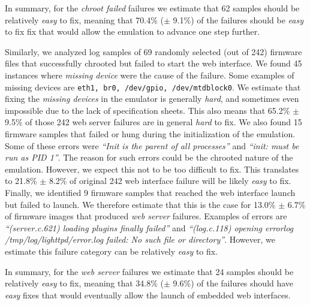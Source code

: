 \documentclass[conference]{./templates/ndss/IEEEtran}
\newcounter{t0d0_counter}
\newcounter{pr00f_counter}
\newcommand{\CountFirmwareEmulatedWebServerNOTStarted}{242}
\newcommand{\EmulatedNOTOKRandSamplFixEASY}{62}
\newcommand{\EmulatedNOTOKRandSamplFixEASYPct}{70.4\%}
\newcommand{\EmulatedNOTOKRandSamplFixEASYConfInt}{9.1\%}
\newcommand{\WebServerNOTOKRandSampl}{69}
\newcommand{\WebServerNOTOKRandSamplDeviceFail}{45}
\newcommand{\WebServerNOTOKRandSamplDeviceFailPct}{65.2\%}
\newcommand{\WebServerNOTOKRandSamplDeviceFailConfInt}{9.5\%}
\newcommand{\WebServerNOTOKRandSamplInitFail}{15}
\newcommand{\WebServerNOTOKRandSamplInitFailPct}{21.8\%}
\newcommand{\WebServerNOTOKRandSamplInitFailConfInt}{8.2\%}
\newcommand{\WebServerNOTOKRandSamplWebservFail}{9}
\newcommand{\WebServerNOTOKRandSamplWebservFailPct}{13.0\%}
\newcommand{\WebServerNOTOKRandSamplWebservFailConfInt}{6.7\%}
\newcommand{\WebServerNOTOKRandSamplFixEASY}{24}
\newcommand{\WebServerNOTOKRandSamplFixEASYPct}{34.8\%}
\newcommand{\WebServerNOTOKRandSamplFixEASYConfInt}{9.6\%}
\begin{document}
    In summary, for the \emph{chroot failed} failures we estimate that 
\EmulatedNOTOKRandSamplFixEASY{} samples should be relatively \emph{easy} to fix, 
meaning that \EmulatedNOTOKRandSamplFixEASYPct{} 
($\pm$ \EmulatedNOTOKRandSamplFixEASYConfInt{}) of the failures should be \emph{easy} to fix  fix
that would allow the emulation to advance one step further. 

Similarly, we analyzed log samples of \WebServerNOTOKRandSampl{} randomly selected 
(out of \CountFirmwareEmulatedWebServerNOTStarted{}) firmware files that 
successfully chrooted but failed to start the web interface. 
    We found \WebServerNOTOKRandSamplDeviceFail{} instances where \emph{missing device} 
were the cause of the failure. Some examples of missing devices are 
\texttt{eth1, br0, /dev/gpio, /dev/mtdblock0}. We estimate that fixing 
the \emph{missing devices} in the emulator is generally \emph{hard}, and 
sometimes even impossible due to the lack of specification sheets. 
This also means that \WebServerNOTOKRandSamplDeviceFailPct{} $\pm$ 
\WebServerNOTOKRandSamplDeviceFailConfInt{} of those 
\CountFirmwareEmulatedWebServerNOTStarted{} web server failures are 
in general \emph{hard} to fix. 
    We also found \WebServerNOTOKRandSamplInitFail{} firmware samples 
that failed or hung during the initialization of the emulation. 
Some of these errors were \emph{``Init is the parent of all processes''} 
and \emph{``init: must be run as PID 1''}. The reason for such errors 
could be the chrooted nature of the emulation. However, we expect 
this not to be too difficult to fix. This translates to \WebServerNOTOKRandSamplInitFailPct{} 
$\pm$ \WebServerNOTOKRandSamplInitFailConfInt{} of original 
\CountFirmwareEmulatedWebServerNOTStarted{} web interface failure 
will be likely \emph{easy} to fix. 
    Finally, we identified \WebServerNOTOKRandSamplWebservFail{} firmware 
samples that reached the web interface launch but failed to launch. 
We therefore estimate that this is the case for \WebServerNOTOKRandSamplWebservFailPct{} $\pm$ 
\WebServerNOTOKRandSamplWebservFailConfInt{} of firmware images that 
produced \emph{web server} failures. Examples of errors are 
\emph{``(server.c.621) loading plugins finally failed''} 
and \emph{``(log.c.118) opening errorlog /tmp/log/lighttpd/error.log failed: No such file or directory''}. 
However, we estimate this failure category can be relatively \emph{easy} to fix. 

    In summary, for the \emph{web server} failures we estimate that 
\WebServerNOTOKRandSamplFixEASY{} samples should be relatively \emph{easy} to fix, 
meaning that \WebServerNOTOKRandSamplFixEASYPct{} 
($\pm$ \WebServerNOTOKRandSamplFixEASYConfInt{}) of the failures should have \emph{easy} 
fixes that would eventually allow the launch of embedded web interfaces. 
\end{document}
